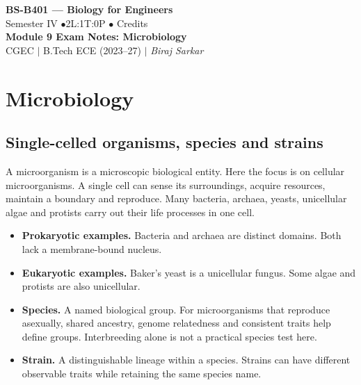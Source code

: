\documentclass[12pt,a4paper]{article}
\begin{document}
\begin{center}
  {\LARGE\bfseries\color{myred} BS-B401 --- Biology for Engineers}\\[5pt]
  {\normalsize\color{mydark} Semester IV \quad$\bullet$\quad 2L:1T:0P \quad$\bullet$ Credits}\\[3pt]
  {\normalsize\color{myteal}\textbf{Module 9 Exam Notes: Microbiology}}\\[3pt]
  {\small\color{mydark} CGEC \;$|$\; B.Tech ECE (2023--27) \;$|$\; \textit{Biraj Sarkar}}
\end{center}
\vspace{2pt}
\noindent{\color{myred}\rule{\linewidth}{1.5pt}}
\vspace{2pt}

\hypersetup{linkcolor=mydark}
\tableofcontents
\hypersetup{linkcolor=myteal}
\newpage

\section{Microbiology}
\subsection{Single-celled organisms, species and strains}
\begin{tcolorbox}[defbox, title={Microorganism}]
A microorganism is a microscopic biological entity. Here the focus is on cellular microorganisms. A single cell can sense its surroundings, acquire resources, maintain a boundary and reproduce. Many bacteria, archaea, yeasts, unicellular algae and protists carry out their life processes in one cell.
\end{tcolorbox}

\begin{itemize}[leftmargin=*, itemsep=3pt, topsep=4pt]
  \item \textbf{Prokaryotic examples.} Bacteria and archaea are distinct domains. Both lack a membrane-bound nucleus.
  \item \textbf{Eukaryotic examples.} Baker's yeast is a unicellular fungus. Some algae and protists are also unicellular.
  \item \textbf{Species.} A named biological group. For microorganisms that reproduce asexually, shared ancestry, genome relatedness and consistent traits help define groups. Interbreeding alone is not a practical species test here.
  \item \textbf{Strain.} A distinguishable lineage within a species. Strains can have different observable traits while retaining the same species name.
\end{itemize}
\end{document}
